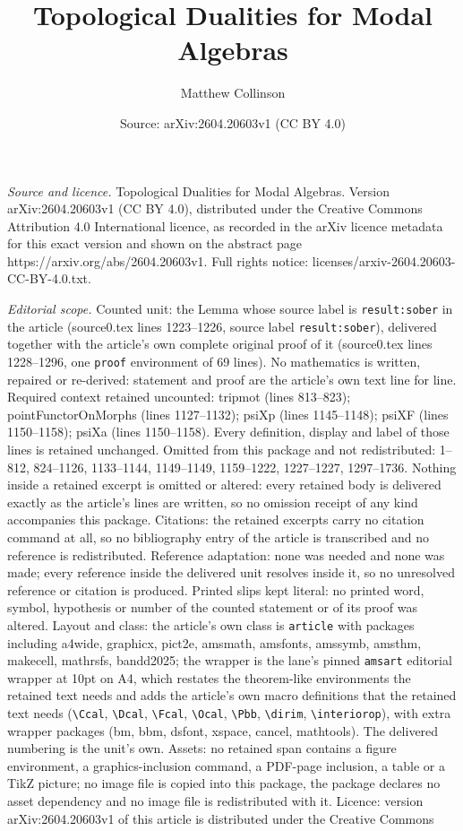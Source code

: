 \documentclass[10pt,a4paper]{amsart}
\title[Topological Dualities for Modal Algebras]{Topological Dualities for Modal Algebras}
\author{Matthew Collinson}
\date{Source: arXiv:2604.20603v1 (CC BY 4.0)}
\begin{document}
\maketitle

\noindent\emph{Source and licence.} Topological Dualities for Modal Algebras. Version arXiv:2604.20603v1 (CC BY 4.0), distributed under the Creative Commons Attribution 4.0 International licence, as recorded in the arXiv licence metadata for this exact version and shown on the abstract page https://arxiv.org/abs/2604.20603v1. Full rights notice: licenses/arxiv-2604.20603-CC-BY-4.0.txt.\par\smallskip

\noindent\textit{Editorial scope.} Counted unit: the Lemma whose source label is \texttt{result:sober} in the article (source0.tex lines 1223--1226, source label \texttt{result:sober}), delivered together with the article's own complete original proof of it (source0.tex lines 1228--1296, one \texttt{proof} environment of 69 lines). No mathematics is written, repaired or re-derived: statement and proof are the article's own text line for line. Required context retained uncounted: tripmot (lines 813--823); pointFunctorOnMorphs (lines 1127--1132); psiXp (lines 1145--1148); psiXF (lines 1150--1158); psiXa (lines 1150--1158). Every definition, display and label of those lines is retained unchanged. Omitted from this package and not redistributed: 1--812, 824--1126, 1133--1144, 1149--1149, 1159--1222, 1227--1227, 1297--1736. Nothing inside a retained excerpt is omitted or altered: every retained body is delivered exactly as the article's lines are written, so no omission receipt of any kind accompanies this package. Citations: the retained excerpts carry no citation command at all, so no bibliography entry of the article is transcribed and no reference is redistributed. Reference adaptation: none was needed and none was made; every reference inside the delivered unit resolves inside it, so no unresolved reference or citation is produced. Printed slips kept literal: no printed word, symbol, hypothesis or number of the counted statement or of its proof was altered. Layout and class: the article's own class is \texttt{article} with packages including a4wide, graphicx, pict2e, amsmath, amsfonts, amssymb, amsthm, makecell, mathrsfs, bandd2025; the wrapper is the lane's pinned \texttt{amsart} editorial wrapper at 10pt on A4, which restates the theorem-like environments the retained text needs and adds the article's own macro definitions that the retained text needs (\texttt{\textbackslash Ccal}, \texttt{\textbackslash Dcal}, \texttt{\textbackslash Fcal}, \texttt{\textbackslash Ocal}, \texttt{\textbackslash Pbb}, \texttt{\textbackslash dirim}, \texttt{\textbackslash interiorop}), with extra wrapper packages (bm, bbm, dsfont, xspace, cancel, mathtools). The delivered numbering is the unit's own. Assets: no retained span contains a figure environment, a graphics-inclusion command, a PDF-page inclusion, a table or a TikZ picture; no image file is copied into this package, the package declares no asset dependency and no image file is redistributed with it. Licence: version arXiv:2604.20603v1 of this article is distributed under the Creative Commons 
\end{document}
